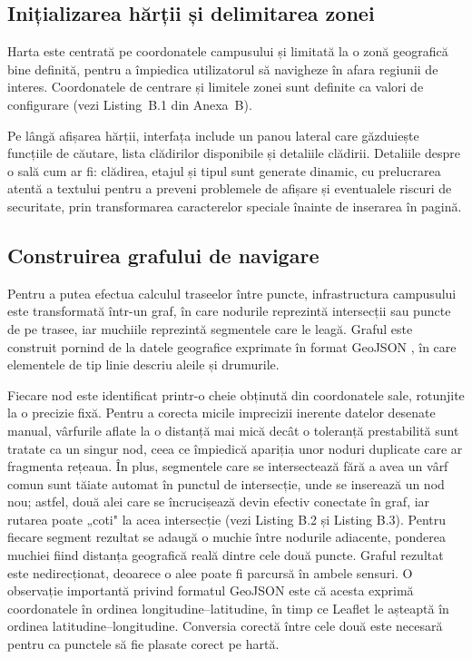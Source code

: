 \subsection{Inițializarea hărții și delimitarea zonei}
\label{subsec:init-harta}

Harta este centrată pe coordonatele campusului și limitată la o zonă
geografică bine definită, pentru a împiedica utilizatorul să navigheze în
afara regiunii de interes. Coordonatele de centrare și limitele zonei sunt
definite ca valori de configurare (vezi Listing~B.1 din Anexa~B).

Pe lângă afișarea hărții, interfața include un panou lateral care găzduiește
funcțiile de căutare, lista clădirilor disponibile și detaliile clădirii. Detaliile despre o sală cum ar fi: clădirea, etajul
și tipul sunt generate dinamic, cu prelucrarea atentă a textului pentru a
preveni problemele de afișare și eventualele riscuri de securitate, prin
transformarea caracterelor speciale înainte de inserarea în pagină.

\subsection{Construirea grafului de navigare}
\label{subsec:graf}

Pentru a putea efectua calculul traseelor între puncte, infrastructura campusului
este transformată într-un graf, în care nodurile reprezintă intersecții sau
puncte de pe trasee, iar muchiile reprezintă segmentele care le leagă.
Graful este construit pornind de la datele geografice exprimate în format
GeoJSON \cite{GeoJSON}, în care elementele de tip linie descriu aleile și
drumurile.

Fiecare nod este identificat printr-o cheie obținută din coordonatele sale,
rotunjite la o precizie fixă. Pentru a corecta micile imprecizii inerente
datelor desenate manual, vârfurile aflate la o distanță mai mică decât o
toleranță prestabilită sunt tratate ca un singur nod, ceea ce împiedică
apariția unor noduri duplicate care ar fragmenta rețeaua. În plus, segmentele
care se intersectează fără a avea un vârf comun sunt tăiate automat în punctul
de intersecție, unde se inserează un nod nou; astfel, două alei care se
încrucișează devin efectiv conectate în graf, iar rutarea poate „coti" la acea
intersecție (vezi Listing B.2 și Listing B.3).
Pentru fiecare segment rezultat se adaugă o muchie între nodurile adiacente,
ponderea muchiei fiind distanța geografică reală dintre cele două puncte.
Graful rezultat este nedirecționat, deoarece o alee poate fi parcursă în
ambele sensuri. O observație importantă privind formatul GeoJSON este că
acesta exprimă coordonatele în ordinea longitudine–latitudine, în timp ce
Leaflet le așteaptă în ordinea latitudine–longitudine. Conversia corectă între
cele două este necesară pentru ca punctele să fie plasate corect pe hartă.

